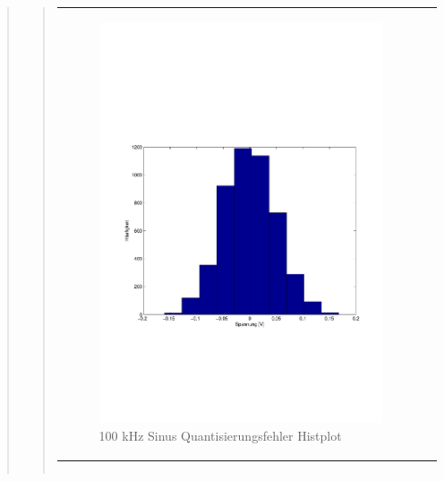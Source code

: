 \begin{quote}
\begin{quote}
\begin{center}
\begin{tabular}{ll}
                \begin{minipage}{0.6\textwidth}
                    \begin{figure}[H]
                        \includegraphics[scale=0.5, trim = 16mm 70mm 16mm 85mm, clip]
                                        {Bilder/100kHz_sin_Quant_Hist}
                        \caption{100 kHz Sinus Quantisierungsfehler Histplot}
                        \label{fig:100kHz_sin_Hist}
                    \end{figure}
                \end{minipage}
            
            \end{tabular}
        \end{center}
        
        
        
        \begin{center}
            \begin{tabular}{ll}
            

\end{tabular}
\end{center}
\end{quote}
\end{quote}
